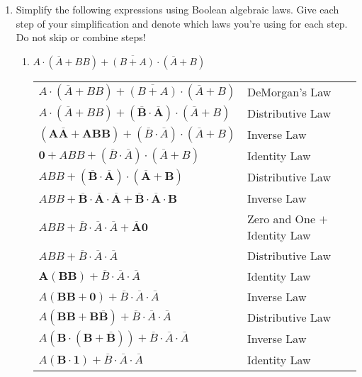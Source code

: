 \documentclass{article}
\begin{document}
    \begin{enumerate}
        \item Simplify the following expressions using Boolean algebraic laws. Give each step of your simplification and denote which laws you’re using for each step. Do not skip or combine steps!
        \begin{enumerate}
            \item $A \cdot (\overline{A} + BB) + \overline{(B+A)} \cdot (\overline{A} + B)$\\[0.25in]
            \begin{tabular}{l l}
                $A \cdot (\overline{A} + BB) + \overline{(B+A)} \cdot (\overline{A} + B)$ & DeMorgan's Law\\
                $A \cdot (\overline{A}+BB) + \mathbf{(\overline{B} \cdot \overline{A})} \cdot (\overline{A} + B)$ & Distributive Law\\
                $\mathbf{(A\overline{A} + ABB)} + (\overline{B} \cdot \overline{A}) \cdot (\overline{A} + B)$ & Inverse Law\\
                $\mathbf{0} + ABB + (\overline{B} \cdot \overline{A}) \cdot (\overline{A} + B)$ & Identity Law\\
                $ABB + \mathbf{(\overline{B} \cdot \overline{A}) \cdot (\overline{A}+B)}$ & Distributive Law\\
                $ABB + \mathbf{\overline{B} \cdot \overline{A} \cdot \overline{A} + \overline{B} \cdot \overline{A} \cdot B}$ & Inverse Law\\
                $ABB + \overline{B} \cdot \overline{A} \cdot \overline{A} + \mathbf{\overline{A}0}$ & Zero and One $+$ Identity Law\\
                $ABB + \overline{B} \cdot \overline{A} \cdot \overline{A}$ & Distributive Law \\
                $\mathbf{A(BB)} + \overline{B} \cdot \overline{A} \cdot \overline{A}$ & Identity Law\\
                $A(\mathbf{BB+0}) + \overline{B} \cdot \overline{A} \cdot \overline{A}$ & Inverse Law\\
                $A(\mathbf{BB+B\overline{B}}) + \overline{B} \cdot \overline{A} \cdot \overline{A}$ & Distributive Law\\
                $A(\mathbf{B \cdot (B+\overline{B})}) + \overline{B} \cdot \overline{A} \cdot \overline{A}$ & Inverse Law\\
                $A(\mathbf{B \cdot 1}) + \overline{B} \cdot \overline{A} \cdot \overline{A}$ & Identity Law\\

\end{tabular}
\end{enumerate}
\end{enumerate}
\end{document}
